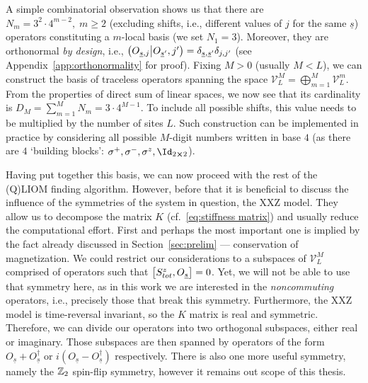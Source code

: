 A simple combinatorial observation shows us that there are \(N_m = 3^2\cdot 4^{m-2}, \; m \geq 2\)
(excluding shifts, i.e., different values of \(j\) for the same \(\underline{s}\)) operators
constituting a \(m\)-local basis (we set \(N_1 = 3\)). Moreover, they are orthonormal
\textit{by design}, i.e., \(\left(O_{\underline{s},j} \middle| O_{\underline{s}^{\prime}},j^{\prime}\right) =
\delta_{\underline{s},\underline{s}^{\prime}}\delta_{j,j^{\prime}}\) (see Appendix~\ref{app:orthonormality} for proof).
Fixing \(M>0\) (usually \(M<L\)), we can construct the basis of traceless operators spanning
the space \(\mathcal{V}_L^M = \bigoplus_{m=1}^{M} \mathcal{V}_L^m\). From the properties of 
direct sum of linear spaces, we now see that its cardinality is \(D_M = \sum_{m=1}^{M} N_m = 
 3 \cdot 4^{M-1}\). To include all possible shifts, this value needs to be multiplied by
 the number of sites \(L\). Such construction can be implemented in practice by considering
 all possible \(M\)-digit numbers written in base \(4\) (as there are \(4\) `building blocks':
  \(\sigma^{+},\sigma^{-},\sigma^{z},\Id_{2\cross 2}\)). 

Having put together this basis, we can now proceed with the rest of the (Q)LIOM finding algorithm.
However, before that it is beneficial to discuss the influence of the symmetries of the system in question,
the XXZ model. They allow us to decompose the matrix \(K\) 
(cf.~\eqref{eq:stiffness matrix}) and usually reduce the computational effort. First and perhaps
the most important one is implied by the fact already discussed in Section~\ref{sec:prelim} ---
conservation of magnetization. We could restrict our considerations to a subspaces
of \(\mathcal{V}_L^M\) comprised of operators such that \(\comm{S_{tot}^z}{O_{\underline{s}}} = 0\).
Yet, we will not be able to use that symmetry here, as in this work we are interested 
in the \textit{noncommuting} operators, i.e., precisely those that break this symmetry.
Furthermore, the XXZ model is time-reversal invariant, so the \(K\) matrix is real and symmetric.
Therefore, we can divide our operators into two orthogonal subspaces, either real or imaginary.
Those subspaces are then spanned by operators of the form 
\(O_{\underline{s}}+O^{\dagger}_{\underline{s}}\) or 
\(i(O_{\underline{s}}-O^{\dagger}_{\underline{s}})\) respectively. There is also one more
useful symmetry, namely the \(\mathbb{Z}_2\) spin-flip symmetry, however it remains out scope of
this thesis. 


